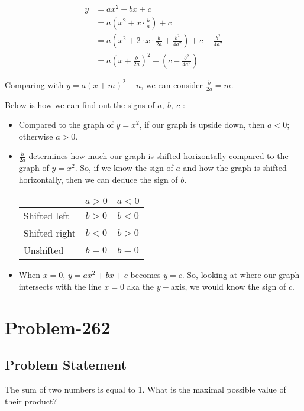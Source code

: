 \documentclass[12pt]{article}
\begin{document}
\begin{equation*}
	\begin{aligned}
		y &= ax^2 + bx + c\\
		  &= a\left( x^2 + x\cdot \frac{b}{a} \right) + c\\
		  &= a\left( x^2 + 2 \cdot x \cdot \frac{b}{2a} + \frac{b^2}{4a^2} \right) + c - \frac{b^2}{4a^2}\\
		  &= a \left( x+\frac{b}{2a} \right)^2 + \left( c - \frac{b^2}{4a^2} \right)
	\end{aligned}
\end{equation*}

Comparing with $y = a(x+m)^2 + n$, we can consider $\frac{b}{2a} = m$.

Below is how we can find out the signs of $a,\ b,\ c$ :
\begin{itemize}
	\item Compared to the graph of $y = x^2$, if our graph is upside down, then $a < 0$; otherwise $a > 0$.
	\item $\frac{b}{2a}$ determines how much our graph is shifted horizontally compared to the graph of $y = x^2$. So, if we know the sign of $a$ and how the graph is shifted horizontally, then we can deduce the sign of $b$. 
	
\begin{table}[ht]
\centering %
\begin{tabular}{| l | c | c |} %
\hline %
 & $a > 0$ & $a < 0$ \\ %
\hline %
Shifted left  & $b > 0$ & $b < 0$ \\
Shifted right & $b < 0$ & $b > 0$ \\
Unshifted     & $b = 0$ & $b = 0$ \\
\hline %
\end{tabular}
\end{table}

	\item When $x = 0$, $y = ax^2 + bx + c$ becomes $y = c$. So, looking at where our graph intersects with the line $x = 0$ aka the $y-$axis, we would know the sign of $c$.
\end{itemize}

\section*{Problem-262}
\subsection*{Problem Statement}
The sum of two numbers is equal to 1. What is the maximal possible value of their product?
\end{document}
